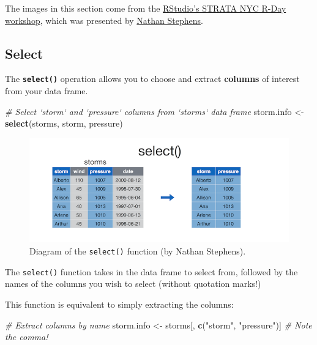 \documentclass[]{book}
\newenvironment{Shaded}{\begin{snugshade}}{\end{snugshade}}
\newcommand{\KeywordTok}[1]{\textcolor[rgb]{0.13,0.29,0.53}{\textbf{#1}}}
\newcommand{\StringTok}[1]{\textcolor[rgb]{0.31,0.60,0.02}{#1}}
\newcommand{\CommentTok}[1]{\textcolor[rgb]{0.56,0.35,0.01}{\textit{#1}}}
\newcommand{\NormalTok}[1]{#1}
\theoremstyle{definition}
\theoremstyle{definition}
\theoremstyle{remark}
\begin{document}
The images in this section come from the
\href{http://bit.ly/rday-nyc-strata15}{RStudio's STRATA NYC R-Day
workshop}, which was presented by
\href{http://conferences.oreilly.com/strata/big-data-conference-ny-2015/public/schedule/speaker/217840}{Nathan
Stephens}.

\subsection{Select}\label{select}

The \textbf{\texttt{select()}} operation allows you to choose and
extract \textbf{columns} of interest from your data frame.

\begin{Shaded}
\begin{Highlighting}[]
\CommentTok{# Select `storm` and `pressure` columns from `storms` data frame}
\NormalTok{storm.info <-}\StringTok{ }\KeywordTok{select}\NormalTok{(storms, storm, pressure)}
\end{Highlighting}
\end{Shaded}

\begin{figure}
\centering
\includegraphics{img/dplyr/select.png}
\caption{Diagram of the \texttt{select()} function (by Nathan
Stephens).}
\end{figure}

The \texttt{select()} function takes in the data frame to select from,
followed by the names of the columns you wish to select (without
quotation marks!)

This function is equivalent to simply extracting the columns:

\begin{Shaded}
\begin{Highlighting}[]
\CommentTok{# Extract columns by name}
\NormalTok{storm.info <-}\StringTok{ }\NormalTok{storms[, }\KeywordTok{c}\NormalTok{(}\StringTok{"storm"}\NormalTok{, }\StringTok{"pressure"}\NormalTok{)]  }\CommentTok{# Note the comma!}
\end{Highlighting}
\end{Shaded}
\end{document}
